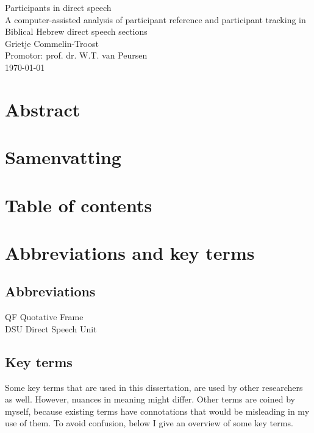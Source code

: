 \documentclass[twoside,a4paper,10pt]{article}
\newcommand{\myTitle}{Participants in direct speech\xspace}
\newcommand{\mySubtitle}{A computer-assisted analysis of participant reference and participant tracking in Biblical Hebrew direct speech sections\xspace}
\newcommand{\myName}{Grietje Commelin-Troost\xspace}
\begin{document}
\begin{center}
\null
\vspace*{40ex}
{\LARGE \myTitle}\\
\vspace*{10ex}
{\Large \mySubtitle}\\
\vspace*{55ex}
{\large \myName}\\
\bigskip
{\large Promotor: prof. dr. W.T. van Peursen}\\
\bigskip
\normalsize \today
\vfill
\end{center}

\newpage
\newpage
\section*{Abstract}
\newpage
\section*{Samenvatting}
\newpage
\section*{Table of contents}
\newpage
\section*{Abbreviations and key terms}
\subsection{Abbreviations}
\begin{tabbing}
QF \hspace{5ex} \= Quotative Frame \\
DSU \> Direct Speech Unit \\

\end{tabbing}

\subsection{Key terms}
Some key terms that are used in this dissertation, are used by other researchers as well. However, nuances in meaning might differ. Other terms are coined by myself, because existing terms have connotations that would be misleading in my use of them. To avoid confusion, below I give an overview of some key terms.
\end{document}
